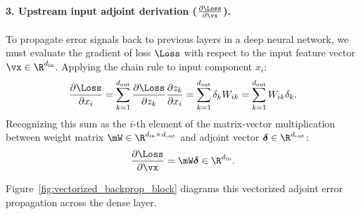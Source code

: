 \documentclass[../../main.tex]{subfiles}
\begin{document}
\paragraph{3. Upstream input adjoint derivation ($\frac{\partial \Loss}{\partial \vx}$).}
To propagate error signals back to previous layers in a deep neural network, we must evaluate the gradient of loss $\Loss$ with respect to the input feature vector $\vx \in \R^{d_{\text{in}}}$. Applying the chain rule to input component $x_i$:
\begin{equation}
\frac{\partial \Loss}{\partial x_i} = \sum_{k=1}^{d_{\text{out}}} \frac{\partial \Loss}{\partial z_k} \frac{\partial z_k}{\partial x_i} = \sum_{k=1}^{d_{\text{out}}} \delta_k W_{ik} = \sum_{k=1}^{d_{\text{out}}} W_{ik} \delta_k.
\end{equation}
Recognizing this sum as the $i$-th element of the matrix-vector multiplication between weight matrix $\mW \in \R^{d_{\text{in}} \times d_{\text{out}}}$ and adjoint vector $\bm{\delta} \in \R^{d_{\text{out}}}$:
\begin{equation}
\label{eq:input_vector_gradient}
\frac{\partial \Loss}{\partial \vx} = \mW \bm{\delta} \in \R^{d_{\text{in}}}.
\end{equation}

Figure~\ref{fig:vectorized_backprop_block} diagrams this vectorized adjoint error propagation across the dense layer.
\end{document}
